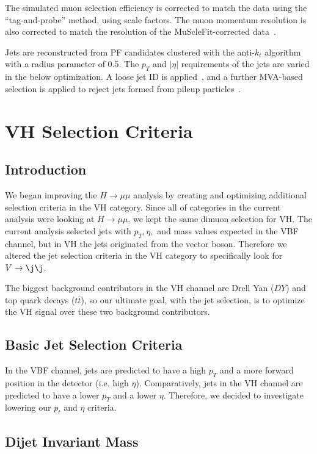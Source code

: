 \documentclass[12pt]{article}
\begin{document}
The simulated muon selection efficiency is corrected to match the data using 
the ``tag-and-probe'' method, using scale factors.  The muon momentum resolution
is also corrected to match the resolution of the MuScleFit-corrected data~\cite{AN2012_459}.

Jets are reconstructed from PF candidates clustered with the anti-$k_t$ algorithm with
a radius parameter of 0.5.  The $p_T$ and $|\eta|$ requirements of the jets are varied in
the below optimization.  A loose jet ID is applied~\cite{AN2012_459}, and a further
MVA-based selection is applied to reject jets formed from pileup particles~\cite{PUID}.

\section{VH Selection Criteria}

\subsection{Introduction}

We began improving the $H \rightarrow \mu \mu$ analysis by creating and optimizing additional selection criteria in the VH category. 
Since all of categories in the current analysis were looking at $H \rightarrow \mu \mu$, we kept the same dimuon selection for VH. 
The current analysis selected jets with $p_{T}, \eta,$ and mass values expected in the VBF channel, but in VH the jets originated from the vector boson. 
Therefore we altered the jet selection criteria in the VH category to specifically look for $V \rightarrow \j \j$.

The biggest background contributors in the VH channel are Drell Yan ($DY$) and top quark decays ($t\overline{t}$), 
so our ultimate goal, with the jet selection, is to optimize the VH signal over these two background contributors.

\subsection{Basic Jet Selection Criteria}

In the VBF channel, jets are predicted to have a high $p_{T}$ and a more forward position in the detector (i.e. high $\eta$). 
Comparatively, jets in the VH channel are predicted to have a lower $p_{T}$ and a lower $\eta$. 
Therefore, we decided to investigate lowering our $p_{t}$ and $\eta$ criteria.

\subsection{Dijet Invariant Mass}
\end{document}

